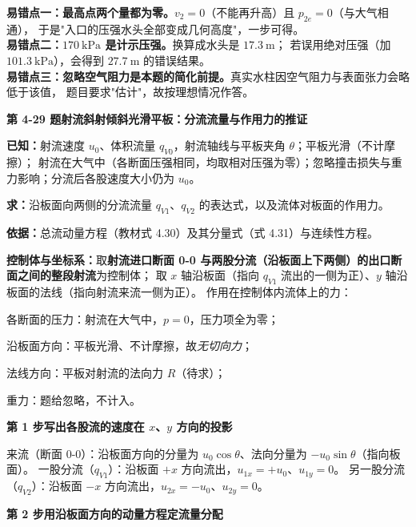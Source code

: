 \begin{yicuo}
\textbf{易错点一：最高点两个量都为零。}$v_2=0$（不能再升高）且 $p_{2e}=0$（与大气相通），
于是"入口的压强水头全部变成几何高度"，一步可得。\\
\textbf{易错点二：$170\ \mathrm{kPa}$ 是计示压强。}换算成水头是 $17.3\ \mathrm{m}$；
若误用绝对压强（加 $101.3\ \mathrm{kPa}$），会得到 $27.7\ \mathrm{m}$ 的错误结果。\\
\textbf{易错点三：忽略空气阻力是本题的简化前提。}真实水柱因空气阻力与表面张力会略低于该值，
题目要求"估计"，故按理想情况作答。
\end{yicuo}

\noindent\textbf{第 4-29 题\quad 射流斜射倾斜光滑平板：分流流量与作用力的推证}

\begin{jie}
\textbf{已知：}射流速度 $u_0$、体积流量 $q_{V0}$，射流轴线与平板夹角 $\theta$；平板光滑（不计摩擦）；
射流在大气中（各断面压强相同，均取相对压强为零）；忽略撞击损失与重力影响；分流后各股速度大小仍为 $u_0$。

\textbf{求：}沿板面向两侧的分流流量 $q_{V1}$、$q_{V2}$ 的表达式，以及流体对板面的作用力。

\textbf{依据：}总流动量方程（教材式 4.30）及其分量式（式 4.31）与连续性方程。

\textbf{控制体与坐标系：}取\textbf{射流进口断面 0-0 与两股分流（沿板面上下两侧）的出口断面之间的整段射流}为控制体；
取 $x$ 轴沿板面（指向 $q_{V1}$ 流出的一侧为正）、$y$ 轴沿板面的法线（指向射流来流一侧为正）。
作用在控制体内流体上的力：
\begin{xiaowen}
\item 各断面的压力：射流在大气中，$p=0$，压力项全为零；
\item 沿板面方向：平板光滑、不计摩擦，故\emph{无切向力}；
\item 法线方向：平板对射流的法向力 $R$（待求）；
\item 重力：题给忽略，不计入。
\end{xiaowen}

\textbf{第 1 步\quad 写出各股流的速度在 $x$、$y$ 方向的投影}

来流（断面 0-0）：沿板面方向的分量为 $u_0\cos\theta$、法向分量为 $-u_0\sin\theta$（指向板面）。
一股分流（$q_{V1}$）：沿板面 $+x$ 方向流出，$u_{1x}=+u_0$、$u_{1y}=0$。
另一股分流（$q_{V2}$）：沿板面 $-x$ 方向流出，$u_{2x}=-u_0$、$u_{2y}=0$。

\textbf{第 2 步\quad 用沿板面方向的动量方程定流量分配}


\end{jie}
